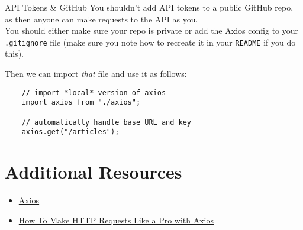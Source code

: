 \begin{infobox}{API Tokens \& GitHub}
    You shouldn't add API tokens to a public GitHub repo, as then anyone can make requests to the API as you.
    \\

    You should either make sure your repo is private or add the Axios config to your \texttt{.gitignore} file (make sure you note how to recreate it in your \texttt{README} if you do this).
\end{infobox}

Then we can import \textit{that} file and use it as follows:

\begin{verbatim}
    // import *local* version of axios
    import axios from "./axios";

    // automatically handle base URL and key
    axios.get("/articles");
\end{verbatim}



\section{Additional Resources}

\begin{itemize}[leftmargin=*]
    \item \href{https://github.com/axios/axios}{Axios}
    \item \href{https://blog.logrocket.com/how-to-make-http-requests-like-a-pro-with-axios/}{How To Make HTTP Requests Like a Pro with Axios}
\end{itemize}

